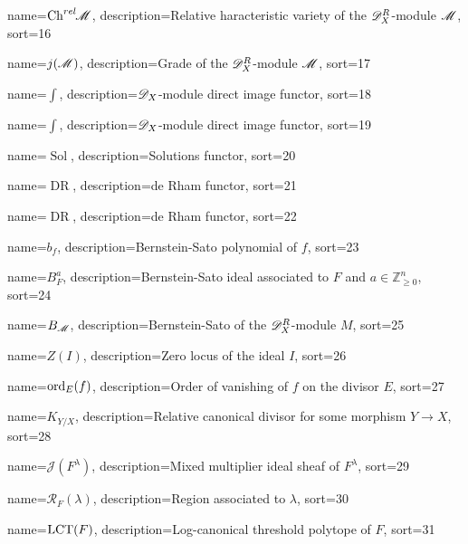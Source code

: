 {
  name={\ensuremath{\Chrel \M}},
  description={Relative haracteristic variety of the $\mathscr{D}_X^R$-module $\mathscr{M}$},
  sort=16
}


{
  name={\ensuremath{j(\M)}},
  description={Grade of the $\mathscr{D}_X^R$-module $\mathscr{M}$},
  sort=17
}


{
  name={\ensuremath{\int}},
  description={$\mathscr{D}_X$-module direct image functor},
  sort=18
}


{
  name={\ensuremath{\int}},
  description={$\mathscr{D}_X$-module direct image functor},
  sort=19
}


{
  name={\ensuremath{\operatorname{Sol}}},
  description={Solutions functor},
  sort=20
}


{
  name={\ensuremath{\operatorname{DR}}},
  description={de Rham functor},
  sort=21
}


{
  name={\ensuremath{\operatorname{DR}}},
  description={de Rham functor},
  sort=22
}


{
  name={\ensuremath{b_f}},
  description={Bernstein-Sato polynomial of $f$},
  sort=23
}


{
  name={\ensuremath{B_F^a}},
  description={Bernstein-Sato ideal associated to $F$ and $a\in\mathbb{Z}_{\geq 0}^n$},
  sort=24
}


{
  name={\ensuremath{B_\M}},
  description={Bernstein-Sato of the $\mathscr{D}_X^R$-module $M$},
  sort=25
}


{
  name={\ensuremath{Z(I)}},
  description={Zero locus of the ideal $I$},
  sort=26
}


{
  name={\ensuremath{\ord_E(f)}},
  description={Order of vanishing of $f$ on the divisor $E$},
  sort=27
}


{
  name={\ensuremath{K_{Y/X}}},
  description={Relative canonical divisor for some morphism $Y\to X$},
  sort=28
}


{
  name={\ensuremath{\mathcal{J}(F^\lambda)}},
  description={Mixed multiplier ideal sheaf of $F^\lambda$},
  sort=29
}


{
  name={\ensuremath{\mathcal{R}_F(\lambda)}},
  description={Region associated to $\lambda$},
  sort=30
}


{
  name={\ensuremath{\LCT(F)}},
  description={Log-canonical threshold polytope of $F$},
  sort=31
}


